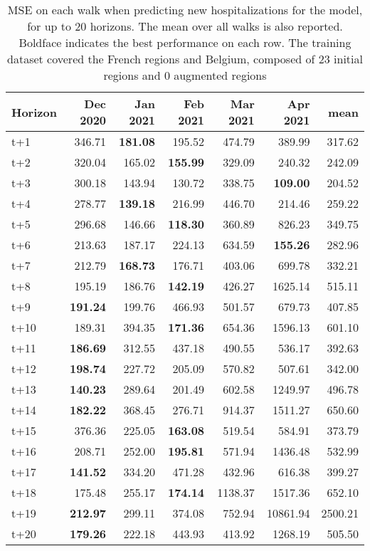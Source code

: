 \begin{table}[H]
\centering
\caption{MSE on each walk when predicting new hospitalizations for the model, for up to 20 horizons. The mean over all walks is also reported. Boldface indicates the best performance on each row. The training dataset covered the French regions and Belgium, composed of 23 initial regions and 0 augmented regions }
\label{tab:MSE_walk_assembly}
\begin{tabular}{lrrrrrr}
\toprule
Horizon &  Dec 2020 &  Jan 2021 &  Feb 2021 &  Mar 2021 &  Apr 2021 &    mean \\
\midrule
t+1  & 346.71  & \textbf{181.08}  & 195.52  & 474.79  & 389.99  & 317.62  \\
t+2  & 320.04  & 165.02  & \textbf{155.99}  & 329.09  & 240.32  & 242.09  \\
t+3  & 300.18  & 143.94  & 130.72  & 338.75  & \textbf{109.00}  & 204.52  \\
t+4  & 278.77  & \textbf{139.18}  & 216.99  & 446.70  & 214.46  & 259.22  \\
t+5  & 296.68  & 146.66  & \textbf{118.30}  & 360.89  & 826.23  & 349.75  \\
t+6  & 213.63  & 187.17  & 224.13  & 634.59  & \textbf{155.26}  & 282.96  \\
t+7  & 212.79  & \textbf{168.73}  & 176.71  & 403.06  & 699.78  & 332.21  \\
t+8  & 195.19  & 186.76  & \textbf{142.19}  & 426.27  & 1625.14  & 515.11  \\
t+9  & \textbf{191.24}  & 199.76  & 466.93  & 501.57  & 679.73  & 407.85  \\
t+10  & 189.31  & 394.35  & \textbf{171.36}  & 654.36  & 1596.13  & 601.10  \\
t+11  & \textbf{186.69}  & 312.55  & 437.18  & 490.55  & 536.17  & 392.63  \\
t+12  & \textbf{198.74}  & 227.72  & 205.09  & 570.82  & 507.61  & 342.00  \\
t+13  & \textbf{140.23}  & 289.64  & 201.49  & 602.58  & 1249.97  & 496.78  \\
t+14  & \textbf{182.22}  & 368.45  & 276.71  & 914.37  & 1511.27  & 650.60  \\
t+15  & 376.36  & 225.05  & \textbf{163.08}  & 519.54  & 584.91  & 373.79  \\
t+16  & 208.71  & 252.00  & \textbf{195.81}  & 571.94  & 1436.48  & 532.99  \\
t+17  & \textbf{141.52}  & 334.20  & 471.28  & 432.96  & 616.38  & 399.27  \\
t+18  & 175.48  & 255.17  & \textbf{174.14}  & 1138.37  & 1517.36  & 652.10  \\
t+19  & \textbf{212.97}  & 299.11  & 374.08  & 752.94  & 10861.94  & 2500.21  \\
t+20  & \textbf{179.26}  & 222.18  & 443.93  & 413.92  & 1268.19  & 505.50  \\

\bottomrule
\end{tabular}
\end{table}
